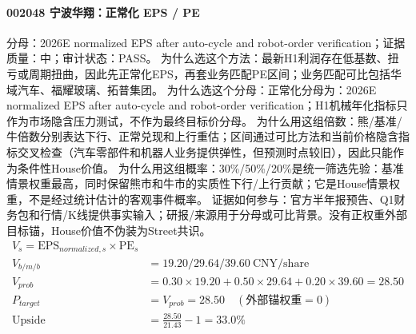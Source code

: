 \paragraph{002048 宁波华翔：正常化 EPS / PE}
分母：2026E normalized EPS after auto-cycle and robot-order verification；证据质量：中；审计状态：PASS。
为什么选这个方法：最新H1利润存在低基数、扭亏或周期扭曲，因此先正常化EPS，再套业务匹配PE区间；业务匹配可比包括华域汽车、福耀玻璃、拓普集团。
为什么选这个分母：正常化分母为：2026E normalized EPS after auto-cycle and robot-order verification；H1机械年化指标只作为市场隐含压力测试，不作为最终目标价分母。
为什么用这组倍数：熊/基准/牛倍数分别表达下行、正常兑现和上行重估；区间通过可比方法和当前价格隐含指标交叉检查（汽车零部件和机器人业务提供弹性，但预测时点较旧），因此只能作为条件性House价值。
为什么用这组概率：30\%/50\%/20\%是统一筛选先验：基准情景权重最高，同时保留熊市和牛市的实质性下行/上行贡献；它是House情景权重，不是经过统计估计的客观事件概率。
证据如何参与：官方半年报预告、Q1财务包和行情/K线提供事实输入；研报/来源用于分母或可比背景。没有正权重外部目标锚，House价值不伪装为Street共识。
\begin{align*}
V_s=\mathrm{EPS}_{normalized,s}\times \mathrm{PE}_s\\
V_{b/m/b} &= 19.20/29.64/39.60\ \mathrm{CNY/share}\\
V_{prob} &= 0.30\times 19.20+0.50\times 29.64+0.20\times 39.60=28.50\\
P_{target} &= V_{prob}=28.50\quad(\text{外部锚权重}=0)\\
\mathrm{Upside} &= \frac{28.50}{21.43}-1=33.0\%\\
\end{align*}

